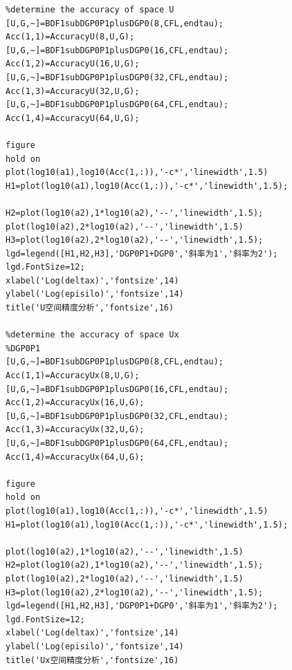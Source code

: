 \documentclass[a4paper,11pt,UTF8]{article}%
\theoremstyle{plain}
\begin{document}
\begin{lstlisting}
%determine the accuracy of space U
[U,G,~]=BDF1subDGP0P1plusDGP0(8,CFL,endtau);
Acc(1,1)=AccuracyU(8,U,G);
[U,G,~]=BDF1subDGP0P1plusDGP0(16,CFL,endtau);
Acc(1,2)=AccuracyU(16,U,G);
[U,G,~]=BDF1subDGP0P1plusDGP0(32,CFL,endtau);
Acc(1,3)=AccuracyU(32,U,G);
[U,G,~]=BDF1subDGP0P1plusDGP0(64,CFL,endtau);
Acc(1,4)=AccuracyU(64,U,G);
	
figure
hold on
plot(log10(a1),log10(Acc(1,:)),'-c*','linewidth',1.5)
H1=plot(log10(a1),log10(Acc(1,:)),'-c*','linewidth',1.5);
	
H2=plot(log10(a2),1*log10(a2),'--','linewidth',1.5);
plot(log10(a2),2*log10(a2),'--','linewidth',1.5)
H3=plot(log10(a2),2*log10(a2),'--','linewidth',1.5);
lgd=legend([H1,H2,H3],'DGP0P1+DGP0','斜率为1','斜率为2');
lgd.FontSize=12;
xlabel('Log(deltax)','fontsize',14)
ylabel('Log(episilo)','fontsize',14)
title('U空间精度分析','fontsize',16)
	
%determine the accuracy of space Ux
%DGP0P1
[U,G,~]=BDF1subDGP0P1plusDGP0(8,CFL,endtau);
Acc(1,1)=AccuracyUx(8,U,G);
[U,G,~]=BDF1subDGP0P1plusDGP0(16,CFL,endtau);
Acc(1,2)=AccuracyUx(16,U,G);
[U,G,~]=BDF1subDGP0P1plusDGP0(32,CFL,endtau);
Acc(1,3)=AccuracyUx(32,U,G);
[U,G,~]=BDF1subDGP0P1plusDGP0(64,CFL,endtau);
Acc(1,4)=AccuracyUx(64,U,G);
	
figure
hold on
plot(log10(a1),log10(Acc(1,:)),'-c*','linewidth',1.5)
H1=plot(log10(a1),log10(Acc(1,:)),'-c*','linewidth',1.5);
	
plot(log10(a2),1*log10(a2),'--','linewidth',1.5)
H2=plot(log10(a2),1*log10(a2),'--','linewidth',1.5);
plot(log10(a2),2*log10(a2),'--','linewidth',1.5)
H3=plot(log10(a2),2*log10(a2),'--','linewidth',1.5);
lgd=legend([H1,H2,H3],'DGP0P1+DGP0','斜率为1','斜率为2');
lgd.FontSize=12;
xlabel('Log(deltax)','fontsize',14)
ylabel('Log(episilo)','fontsize',14)
title('Ux空间精度分析','fontsize',16)
	
\end{lstlisting}
\end{document}
